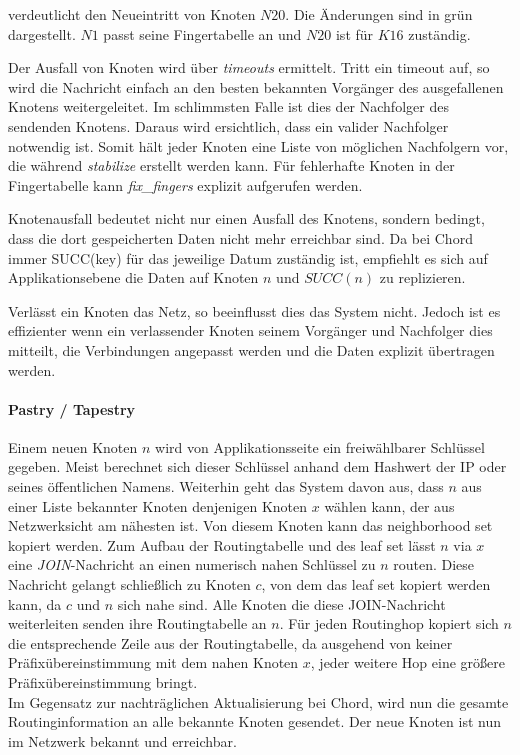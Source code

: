  verdeutlicht den Neueintritt von Knoten $N20$. Die Änderungen sind in grün dargestellt. $N1$ passt seine Fingertabelle an und $N20$ ist für $K16$ zuständig.

Der Ausfall von Knoten wird über \emph{timeouts} ermittelt. Tritt ein timeout auf, so wird die Nachricht einfach an den besten bekannten Vorgänger des ausgefallenen Knotens weitergeleitet. Im schlimmsten Falle ist dies der Nachfolger des sendenden Knotens. Daraus wird ersichtlich, dass ein valider Nachfolger notwendig ist. Somit hält jeder Knoten eine Liste von möglichen Nachfolgern vor, die während \emph{stabilize} erstellt werden kann. Für fehlerhafte Knoten in der Fingertabelle kann \emph{fix\_fingers} explizit aufgerufen werden.

Knotenausfall bedeutet nicht nur einen Ausfall des Knotens, sondern bedingt, dass die dort gespeicherten Daten nicht mehr erreichbar sind. Da bei Chord immer SUCC(key) für das jeweilige Datum zuständig ist, empfiehlt es sich auf Applikationsebene die Daten auf Knoten $n$ und $SUCC(n)$ zu replizieren.

Verlässt ein Knoten das Netz, so beeinflusst dies das System nicht. Jedoch ist es effizienter wenn ein verlassender Knoten seinem Vorgänger und Nachfolger dies mitteilt, die Verbindungen angepasst werden und die Daten explizit übertragen werden.

\paragraph{Pastry / Tapestry}
Einem neuen Knoten $n$ wird von Applikationsseite ein freiwählbarer Schlüssel gegeben. Meist berechnet sich dieser Schlüssel anhand dem Hashwert der IP oder seines öffentlichen Namens. Weiterhin geht das System davon aus, dass $n$ aus einer Liste bekannter Knoten denjenigen Knoten $x$ wählen kann, der aus Netzwerksicht am nähesten ist. Von diesem Knoten kann das neighborhood set kopiert werden. Zum Aufbau der Routingtabelle und des leaf set lässt $n$ via $x$ eine \emph{JOIN}-Nachricht an einen numerisch nahen Schlüssel zu $n$ routen. Diese Nachricht gelangt schließlich zu Knoten $c$, von dem das leaf set kopiert werden kann, da $c$ und $n$ sich nahe sind. Alle Knoten die diese JOIN-Nachricht weiterleiten senden ihre Routingtabelle an $n$. Für jeden Routinghop kopiert sich $n$ die entsprechende Zeile aus der Routingtabelle, da ausgehend von keiner Präfixübereinstimmung mit dem nahen Knoten $x$, jeder weitere Hop eine größere Präfixübereinstimmung bringt.\\
Im Gegensatz zur nachträglichen Aktualisierung bei Chord, wird nun die gesamte Routinginformation an alle bekannte Knoten gesendet. Der neue Knoten ist nun im Netzwerk bekannt und erreichbar.

